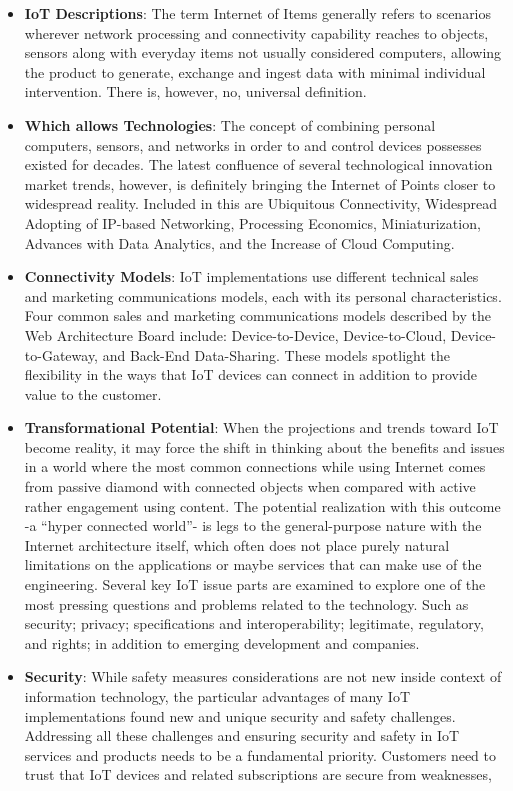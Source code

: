\begin{itemize}
  \item \textbf{IoT Descriptions}: The term Internet of Items generally refers to scenarios wherever network processing and connectivity capability reaches to objects, sensors along with everyday items not usually considered computers, allowing the product to generate, exchange and ingest data with minimal individual intervention. There is, however, no, universal definition.
  \item \textbf{Which allows Technologies}: The concept of combining personal computers, sensors, and networks in order to and control devices possesses existed for decades. The latest confluence of several technological innovation market trends, however, is definitely bringing the Internet of Points closer to widespread reality. Included in this are Ubiquitous Connectivity, Widespread Adopting of IP-based Networking, Processing Economics, Miniaturization, Advances with Data Analytics, and the Increase of Cloud Computing.
  \item \textbf{Connectivity Models}: IoT implementations use different technical sales and marketing communications models, each with its personal characteristics. Four common sales and marketing communications models described by the Web Architecture Board include: Device-to-Device, Device-to-Cloud, Device-to-Gateway, and Back-End Data-Sharing. These models spotlight the flexibility in the ways that IoT devices can connect in addition to provide value to the customer.
  \item \textbf{Transformational Potential}: When the projections and trends toward IoT become reality, it may force  the shift in thinking about the benefits and issues in a world where the most common connections  while using Internet comes from passive diamond with connected objects when compared with active rather engagement using content. The potential realization with this outcome -a “hyper connected world”- is legs to the general-purpose nature with the Internet architecture itself, which often does not place purely natural limitations on the applications or maybe services that can make use of the engineering.  Several key IoT issue parts are examined to explore one of the most pressing questions and problems related to the technology. Such as security; privacy; specifications and interoperability; legitimate, regulatory, and rights; in addition to emerging development and companies.
  \item \textbf{Security}: While safety measures considerations are not new inside context of information technology, the particular advantages of many IoT implementations found new and unique security and safety challenges. Addressing all these challenges and ensuring security and safety in IoT services and products needs to be a fundamental priority. Customers need to trust that IoT devices and related subscriptions are secure from weaknesses,

\end{itemize}
